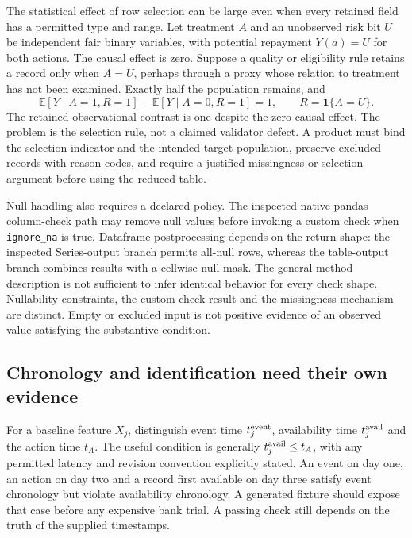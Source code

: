 The statistical effect of row selection can be large even when every
retained field has a permitted type and range. Let treatment $A$ and an
unobserved risk bit $U$ be independent fair binary variables, with potential
repayment $Y(a)=U$ for both actions. The causal effect is zero. Suppose a
quality or eligibility rule retains a record only when $A=U$, perhaps through
a proxy whose relation to treatment has not been examined. Exactly half the
population remains, and
\begin{equation}
 \mathbb E[Y\mid A=1,R=1]-\mathbb E[Y\mid A=0,R=1]=1,
 \qquad R=\mathbf1\{A=U\}.
\end{equation}
The retained observational contrast is one despite the zero causal effect.
The problem is the selection rule, not a claimed validator defect. A product
must bind the selection indicator and the intended target population, preserve
excluded records with reason codes, and require a justified missingness or
selection argument before using the reduced table.~\citep{exec24_pandera_reference}

Null handling also requires a declared policy. The inspected native pandas
column-check path may remove null values before invoking a custom check when
\texttt{ignore\_na} is true. Dataframe postprocessing depends on the return
shape: the inspected Series-output branch permits all-null rows, whereas the
table-output branch combines results with a cellwise null mask. The general
method description is not sufficient to infer identical behavior for every
check shape. Nullability constraints, the custom-check result and the missingness
mechanism are distinct. Empty or excluded input is not positive evidence of
an observed value satisfying the substantive condition.
\citep{exec24_pandera_source}

\subsection{Chronology and identification need their own evidence}
For a baseline feature $X_j$, distinguish event time $t_j^{\rm event}$,
availability time $t_j^{\rm avail}$ and the action time $t_A$. The useful
condition is generally $t_j^{\rm avail}\leq t_A$, with any permitted latency
and revision convention explicitly stated. An event on day one, an action on
day two and a record first available on day three satisfy event chronology
but violate availability chronology. A generated fixture should expose that
case before any expensive bank trial. A passing check still depends on the
truth of the supplied timestamps.~\citep{exec24_pandera_reference}

